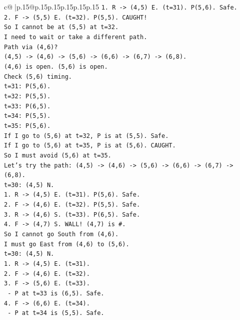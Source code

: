\documentclass{article}
\begin{document}
{\begin{supertabular}{c@{$\;$}|p{.15\linewidth}@{}p{.15\linewidth}p{.15\linewidth}p{.15\linewidth}p{.15\linewidth}p{.15\linewidth}}
{{{\texttt{1. R {-}> (4,5) E. (t=31). P(5,6). Safe.} \\
\texttt{2. F {-}> (5,5) E. (t=32). P(5,5). CAUGHT!} \\
\texttt{So I cannot be at (5,5) at t=32.} \\
\texttt{I need to wait or take a different path.} \\
\texttt{Path via (4,6)?} \\
\texttt{(4,5) {-}> (4,6) {-}> (5,6) {-}> (6,6) {-}> (6,7) {-}> (6,8).} \\
\texttt{(4,6) is open. (5,6) is open.} \\
\texttt{Check (5,6) timing.} \\
\texttt{t=31: P(5,6).} \\
\texttt{t=32: P(5,5).} \\
\texttt{t=33: P(6,5).} \\
\texttt{t=34: P(5,5).} \\
\texttt{t=35: P(5,6).} \\
\texttt{If I go to (5,6) at t=32, P is at (5,5). Safe.} \\
\texttt{If I go to (5,6) at t=35, P is at (5,6). CAUGHT.} \\
\texttt{So I must avoid (5,6) at t=35.} \\
\texttt{Let's try the path: (4,5) {-}> (4,6) {-}> (5,6) {-}> (6,6) {-}> (6,7) {-}> (6,8).} \\
\texttt{t=30: (4,5) N.} \\
\texttt{1. R {-}> (4,5) E. (t=31). P(5,6). Safe.} \\
\texttt{2. F {-}> (4,6) E. (t=32). P(5,5). Safe.} \\
\texttt{3. R {-}> (4,6) S. (t=33). P(6,5). Safe.} \\
\texttt{4. F {-}> (4,7) S. WALL! (4,7) is \#.} \\
\texttt{So I cannot go South from (4,6).} \\
\texttt{I must go East from (4,6) to (5,6).} \\
\texttt{t=30: (4,5) N.} \\
\texttt{1. R {-}> (4,5) E. (t=31).} \\
\texttt{2. F {-}> (4,6) E. (t=32).} \\
\texttt{3. F {-}> (5,6) E. (t=33).} \\
\texttt{   {-} P at t=33 is (6,5). Safe.} \\
\texttt{4. F {-}> (6,6) E. (t=34).} \\
\texttt{   {-} P at t=34 is (5,5). Safe.} \\
}}}
\end{supertabular}}
\end{document}

